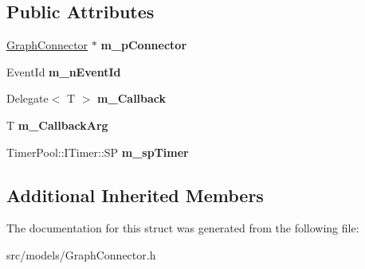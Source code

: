 \subsection*{Public Attributes}
\begin{DoxyCompactItemize}
\item 
\mbox{\label{struct_graph_connector_1_1_event_request_af1f109a752d53a28c5ecc43026158855}} 
\hyperlink{class_graph_connector}{Graph\+Connector} $\ast$ {\bfseries m\+\_\+p\+Connector}
\item 
\mbox{\label{struct_graph_connector_1_1_event_request_aee2b279a9195229d124125b2d266d92d}} 
Event\+Id {\bfseries m\+\_\+n\+Event\+Id}
\item 
\mbox{\label{struct_graph_connector_1_1_event_request_a4942a26334695f55f7a9cd87c6ffcae2}} 
Delegate$<$ T $>$ {\bfseries m\+\_\+\+Callback}
\item 
\mbox{\label{struct_graph_connector_1_1_event_request_a982858032ba2886db41ac2df87726e0b}} 
T {\bfseries m\+\_\+\+Callback\+Arg}
\item 
\mbox{\label{struct_graph_connector_1_1_event_request_ad189be88a7c5b85b51d81b7a20ca1879}} 
Timer\+Pool\+::\+I\+Timer\+::\+SP {\bfseries m\+\_\+sp\+Timer}
\end{DoxyCompactItemize}
\subsection*{Additional Inherited Members}


The documentation for this struct was generated from the following file\+:\begin{DoxyCompactItemize}
\item 
src/models/Graph\+Connector.\+h\end{DoxyCompactItemize}
